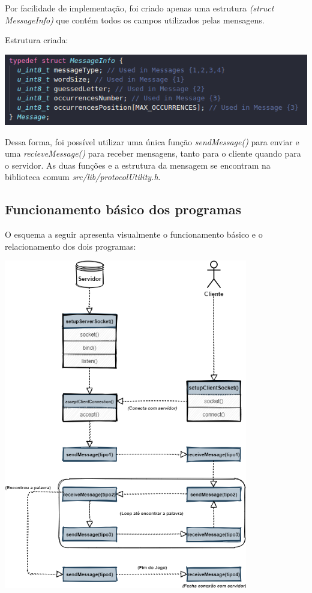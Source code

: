 \documentclass[12pt]{article}
\begin{document}
Por facilidade de implementação, foi criado apenas uma estrutura \emph{(struct MessageInfo)} que contém todos os campos utilizados pelas mensagens.

\newpage
Estrutura criada: 

\begin{center}
    \includegraphics{Figura2.png}
\end{center}

Dessa forma, foi possível utilizar uma única função \emph{sendMessage()} para enviar e uma \emph{recieveMessage()} para receber mensagens, tanto para o cliente quando para o servidor.
As duas funções e a estrutura da mensagem se encontram na biblioteca comum \emph{src/lib/protocolUtility.h}.

\subsection{Funcionamento básico dos programas}
O esquema a seguir apresenta visualmente o funcionamento básico e o relacionamento dos dois programas:

\begin{center}
    \includegraphics[height=39em]{Figura1.png}
\end{center}
\end{document}
